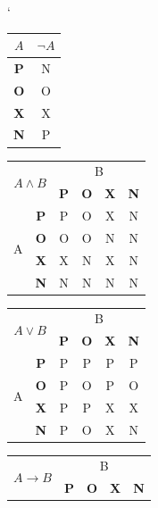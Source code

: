 \documentclass[a4paper,11pt]{article}
\begin{document}
\begin{table}[h]
    
    \centering
    \hfill
    \catcode`
     \begin{tabular}{|c|c|}
     \hline
     $A$ & $\neg A$ \\
     \hline
     \textbf{P} & N \\
     \hline
     \textbf{O} & O \\
     \hline
     \textbf{X} & X \\
     \hline
     \textbf{N} & P \\
     \hline
     \end{tabular}
     \hfill
     \begin{tabular}{|c|c|c|c|c|c|}
     \hline
     \multicolumn{2}{|c|}{\multirow{2}{*}{$A \land B$}} & \multicolumn{4}{c}{B} \vline\\
     \cline{3-6}
     \multicolumn{2}{|c|}{} & \textbf{P} & \textbf{O} & \textbf{X} &\textbf{N}\\
     \hline
     \multirow{4}{*}{A} & \textbf{P} & P & O & X & N \\
     \cline{2-6}
     \cline{2-6}
     & \textbf{O} & O & O & N & N \\
     \cline{2-6}
     & \textbf{X} & X & N & X & N \\
     \cline{2-6}
     & \textbf{N} & N & N & N & N \\
     \hline
     \end{tabular}
     \hfill
     \begin{tabular}{|c|c|c|c|c|c|}
     \hline
     \multicolumn{2}{|c|}{\multirow{2}{*}{$A \lor B$}} & \multicolumn{4}{c}{B} \vline\\
     \cline{3-6}
     \multicolumn{2}{|c|}{} & \textbf{P} & \textbf{O} & \textbf{X} &\textbf{N}\\
     \hline
     \multirow{4}{*}{A} & \textbf{P} & P & P & P & P \\
     \cline{2-6}
     \cline{2-6}
     & \textbf{O} & P & O & P & O \\
     \cline{2-6}
     & \textbf{X} & P & P & X & X \\
     \cline{2-6}
     & \textbf{N} & P & O & X & N \\
     \hline
     \end{tabular}
     \hfill
     \begin{tabular}{|c|c|c|c|c|c|}
     \hline
     \multicolumn{2}{|c|}{\multirow{2}{*}{$A \to B$}} & \multicolumn{4}{c}{B} \vline\\
     \cline{3-6}
     \multicolumn{2}{|c|}{} & \textbf{P} & \textbf{O} & \textbf{X} &\textbf{N}\\

\end{tabular}
\end{table}
\end{document}
